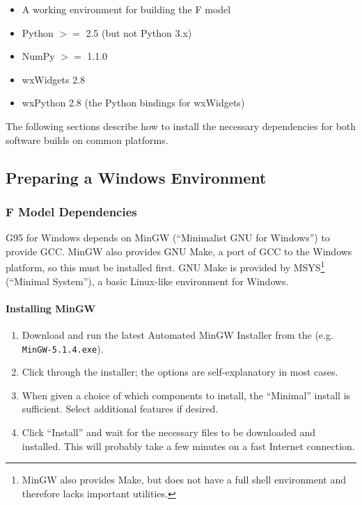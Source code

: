 \begin{itemize}
\item A working environment for building the F model
\item Python $>=$ 2.5 (but not Python 3.x)
\item NumPy $>=$ 1.1.0
\item wxWidgets 2.8
\item wxPython 2.8 (the Python bindings for wxWidgets)
\end{itemize}

The following sections describe how to install the necessary dependencies for both software builds 
on common platforms.


\subsection{Preparing a Windows Environment}
\label{dev:env:windows}

\subsubsection{F Model Dependencies}

G95 for Windows depends on MinGW (``Minimalist GNU for Windows'') to provide GCC.  MinGW also 
provides GNU Make, a port of GCC to the Windows platform, so this must be installed first.  GNU Make 
is provided by MSYS\footnote{MinGW also provides Make, but does not have a full shell environment 
and therefore lacks important utilities.} (``Minimal System''), a basic Linux-like environment for 
Windows. 

\paragraph{Installing MinGW}

\begin{enumerate}

\item Download and run the latest Automated MinGW Installer from the 
 (e.g. \verb|MinGW-5.1.4.exe|).

\item Click through the installer; the options are self-explanatory in most cases.

\item When given a choice of which components to install, the ``Minimal'' install is sufficient.  
Select additional features if desired.

\item Click ``Install'' and wait for the necessary files to be downloaded and installed.  This will 
probably take a few minutes on a fast Internet connection.

\end{enumerate}

